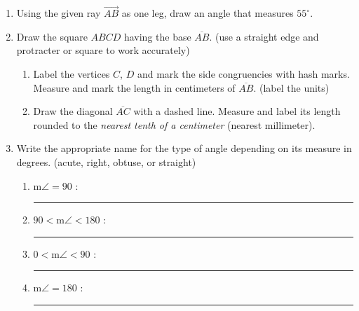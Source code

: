 \documentclass[12pt, twoside]{article}
\begin{document}
\begin{enumerate}
\newpage
\item Using the given ray $\overrightarrow{AB}$ as one leg, draw an angle that measures $55^\circ$. \par \vspace{5cm} \hspace{3cm}

\item Draw the square $ABCD$ having the base $\overline{AB}$. (use a straight edge and protracter or square to work accurately)
\begin{enumerate}
  \item Label the vertices $C$, $D$ and mark the side congruencies with hash marks. Measure and mark the length in centimeters of $\overline{AB}$. (label the units)
  \item Draw the diagonal $\overline{AC}$ with a dashed line. Measure and label its length rounded to the \emph{nearest tenth of a centimeter} (nearest millimeter).
\end{enumerate}
\vspace{5cm}
\begin{center}
\end{center}

\item Write the appropriate name for the type of angle depending on its measure in degrees. (acute, right, obtuse, or straight) \bigskip
  \begin{enumerate}
    \item m$\angle = 90$ : \rule{4cm}{0.15mm} \bigskip
    \item $90 < \text{m}\angle < 180$ : \rule{4cm}{0.15mm} \bigskip
    \item $0< \text{m}\angle < 90$ : \rule{4cm}{0.15mm} \bigskip
    \item m$\angle = 180$ : \rule{4cm}{0.15mm} \bigskip
  \end{enumerate}


\end{enumerate}
\end{document}

